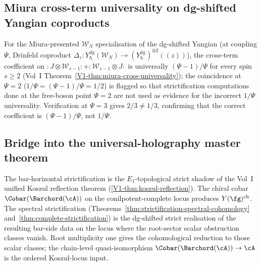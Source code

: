 \subsection{Miura cross-term universality on dg-shifted Yangian coproducts}
\label{subsec:dg-shifted-bridge-miura-coproduct}

\begin{remark}
\label{rem:dg-shifted-bridge-miura-coproduct}
For the Miura-presented $\mathcal{W}_N$ specialisation of the
dg-shifted Yangian
(at coupling $\Psi$, Drinfeld coproduct
$\Delta_z\colon Y^{\mathrm{dg}}_\hbar(\mathcal{W}_N) \to
(Y^{\mathrm{dg}}_\hbar)^{\otimes 2}((z))$), the cross-term
coefficient on $:J\otimes \mathcal{W}_{s-1}: + :\mathcal{W}_{s-1}\otimes J:$
is universally $(\Psi-1)/\Psi$ for every spin $s\ge 2$
(Vol~I Theorem~\ref*{V1-thm:miura-cross-universality}); the
coincidence at $\Psi=2$ ($1/\Psi = (\Psi-1)/\Psi = 1/2$) is
flagged so that strictification computations done at the
free-boson point $\Psi=2$ are not used as evidence for the
incorrect $1/\Psi$ universality. Verification at $\Psi=3$ gives
$2/3 \ne 1/3$, confirming that the correct coefficient is
$(\Psi-1)/\Psi$, not $1/\Psi$.
\end{remark}

\subsection{Bridge into the universal-holography master theorem}
\label{subsec:dg-shifted-bridge-holography-anchor}

\begin{remark}
\label{rem:dg-shifted-bridge-koszul-reflection}
The bar-horizontal strictification is the $E_1$-topological strict
shadow of the Vol~I unified Koszul reflection theorem
(\cref{V1-thm:koszul-reflection}). The chiral cobar
$\Cobar(\Barchord(\cA))$ on the conilpotent-complete locus produces
$Y(\fg)^{\mathrm{ch}}$. The spectral strictification
(Theorems~\ref{thm:strictification-spectral-cohomology}
and~\ref{thm:complete-strictification}) is the dg-shifted strict
realisation of the resulting bar-side data on the locus where the
root-sector scalar obstruction classes vanish. Root multiplicity one
gives the cohomological reduction to those scalar classes; the
chain-level quasi-isomorphism $\Cobar(\Barchord(\cA)) \to \cA$ is the
ordered Koszul-locus input.
\end{remark}

